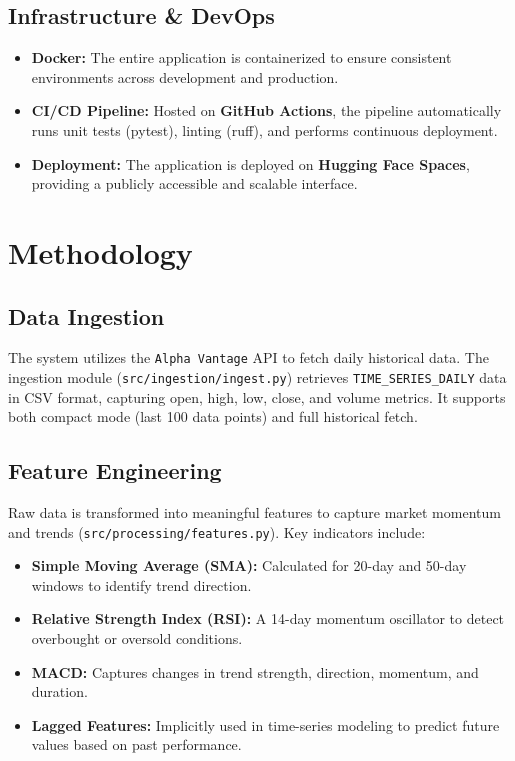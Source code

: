 \documentclass[conference]{IEEEtran}
\begin{document}
\subsection{Infrastructure \& DevOps}
\begin{itemize}
    \item \textbf{Docker:} The entire application is containerized to ensure consistent environments across development and production.
    \item \textbf{CI/CD Pipeline:} Hosted on \textbf{GitHub Actions}, the pipeline automatically runs unit tests (pytest), linting (ruff), and performs continuous deployment.
    \item \textbf{Deployment:} The application is deployed on \textbf{Hugging Face Spaces}, providing a publicly accessible and scalable interface.
\end{itemize}

\section{Methodology}

\subsection{Data Ingestion}
The system utilizes the \texttt{Alpha Vantage} API to fetch daily historical data. The ingestion module (\texttt{src/ingestion/ingest.py}) retrieves \texttt{TIME\_SERIES\_DAILY} data in CSV format, capturing open, high, low, close, and volume metrics. It supports both compact mode (last 100 data points) and full historical fetch.

\subsection{Feature Engineering}
Raw data is transformed into meaningful features to capture market momentum and trends (\texttt{src/processing/features.py}). Key indicators include:
\begin{itemize}
    \item \textbf{Simple Moving Average (SMA):} Calculated for 20-day and 50-day windows to identify trend direction.
    \item \textbf{Relative Strength Index (RSI):} A 14-day momentum oscillator to detect overbought or oversold conditions.
    \item \textbf{MACD:} Captures changes in trend strength, direction, momentum, and duration.
    \item \textbf{Lagged Features:} Implicitly used in time-series modeling to predict future values based on past performance.
\end{itemize}
\end{document}
